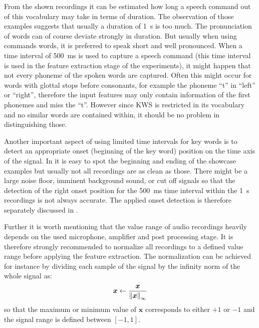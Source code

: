\FloatBarrier
\noindent
From the shown recordings it can be estimated how long a speech command out of this vocabulary may take in terms of duration.
The observation of those examples suggests that usually a duration of \SI{1}{\second} is too much.
The pronunciation of words can of course deviate strongly in duration.
But usually when using commands words, it is preferred to speak short and well pronounced.
When a time interval of \SI{500}{\milli\second} is used to capture a speech command (this time interval is used in the feature extraction stage of the experiments), it might happen that not every phoneme of the spoken words are captured.
Often this might occur for words with glottal stops before consonants, for example the phoneme \enquote{t} in \enquote{left} or \enquote{right}, therefore the input features may only contain information of the first phonemes and miss the \enquote{t}.
However since KWS is restricted in its vocabulary and no similar words are contained within, it should be no problem in distinguishing those.

Another important aspect of using limited time intervals for key words is to detect an appropriate onset (beginning of the key word) position on the time axis of the signal.
In  it is easy to spot the beginning and ending of the showcase examples but usually not all recordings are as clean as those.
There might be a large noise floor, imminent background sound, or cut off signals so that the detection of the right onset position for the \SI{500}{\milli\second} time interval within the \SI{1}{\second} recordings is not always accurate.
The applied onset detection is therefore separately discussed in .

Further it is worth mentioning that the value range of audio recordings heavily depends on the used microphone, amplifier and post processing stage.
It is therefore strongly recommended to normalize all recordings to a defined value range before applying the feature extraction.
The normalization can be achieved for instance by dividing each sample of the signal by the infinity norm of the whole signal as:
\begin{equation}
  \bm{x} \gets \frac{\bm{x}}{\norm{\bm{x}}_\infty}
\end{equation}
so that the maximum or minimum value of $\bm{x}$ corresponds to either $+1$ or $-1$ and the signal range is defined between $[-1, 1]$.